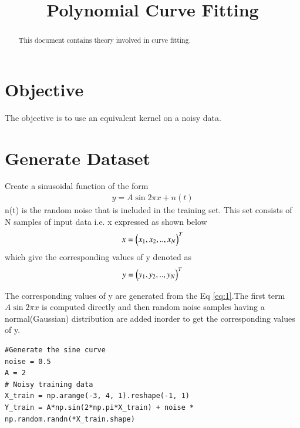 \documentclass[journal,12pt,twocolumn]{IEEEtran}
\begin{document}
\makeatletter
{}
\makeatother
\let\StandardTheFigure\thefigure
\let\vec\mathbf
\renewcommand{\thefigure}{\theproblem}
\def\putbox#1#2#3{\makebox[0in][l]{\makebox[#1][l]{}\raisebox{\baselineskip}[0in][0in]{\raisebox{#2}[0in][0in]{#3}}}}
     \def\rightbox#1{\makebox[0in][r]{#1}}
     \def\centbox#1{\makebox[0in]{#1}}
     \def\topbox#1{\raisebox{-\baselineskip}[0in][0in]{#1}}
\vspace{3cm}
\title{Polynomial Curve Fitting}
\maketitle
\newpage
\bigskip
\renewcommand{\thefigure}{\theenumi}
\renewcommand{\thetable}{\theenumi}
\begin{abstract}
This document contains theory involved in curve fitting.
\end{abstract}
\section{\textbf{Objective}}
The objective is to use an equivalent kernel on a noisy data.
\section{Generate Dataset}
Create a sinusoidal function of the form
\begin{align}
    y = A\sin{2\pi x} + n(t) \label{eq:1}
\end{align}
n(t) is the random noise that is included in the training set. This set consists of N samples of input data i.e. x expressed as shown below
\begin{align}
    x = \begin{pmatrix}x_{1}, x_{2}, .., x_{N}\end{pmatrix}^{T}
\end{align}
which give the corresponding values of y denoted as
\begin{align}
    y = \begin{pmatrix}y_{1}, y_{2}, .., y_{N}\end{pmatrix}^{T}
\end{align}

The corresponding values of y are generated from the Eq \eqref{eq:1}.The first term $A\sin{2\pi x}$ is computed directly and then random noise samples having a normal(Gaussian) distribution are added inorder to get the corresponding values of y.
\begin{lstlisting}
#Generate the sine curve 
noise = 0.5
A = 2  
# Noisy training data
X_train = np.arange(-3, 4, 1).reshape(-1, 1)
Y_train = A*np.sin(2*np.pi*X_train) + noise * np.random.randn(*X_train.shape)
\end{lstlisting}
\end{document}
